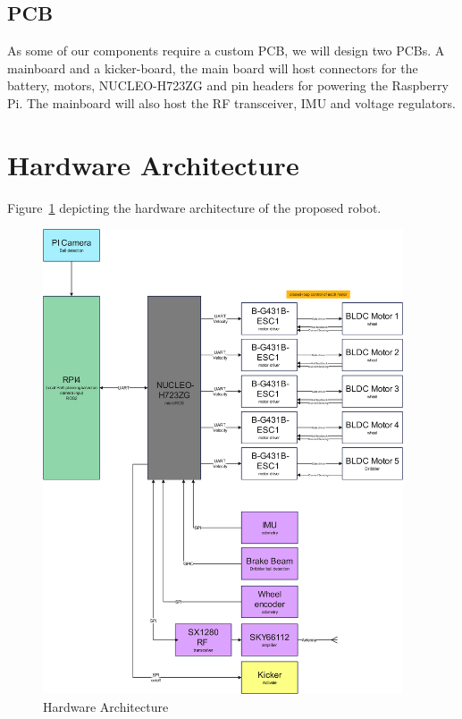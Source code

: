 \documentclass[a4paper,4pt]{article}
\begin{document}
  \subsection{PCB}

  As some of our components require a custom PCB, we will design two
  PCBs. A mainboard and a kicker-board, the main board will host
  connectors for the battery, motors, NUCLEO-H723ZG and pin headers for
  powering the Raspberry Pi. The mainboard will also host the RF
  transceiver, IMU and voltage regulators.

  \section{Hardware Architecture}

  Figure\Figure~\ref{fig:hardware_architecture} depicting the hardware
  architecture of the proposed robot.

  \begin{figure}[H]
    \begin{center}
      \includegraphics[width=0.95\textwidth]{Hardware_architecture.png}
    \end{center}
    \caption{Hardware Architecture}
    \label{fig:hardware_architecture}
  \end{figure}
\end{document}
